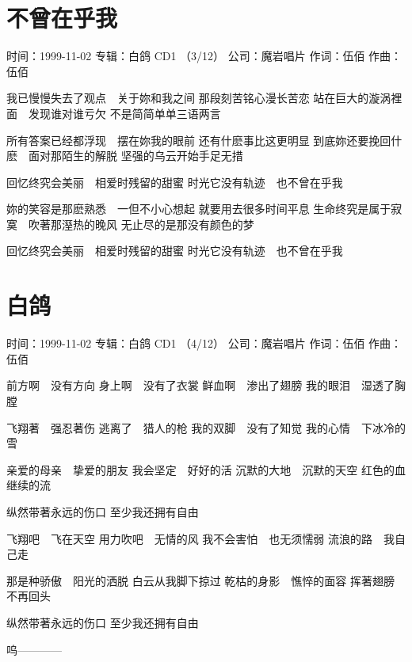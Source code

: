 \documentclass[UTF8,a4paper,oneside,twocolumn,12pt]{ctexbook}
\newcommand{\infopair}[2]{\textbullet #1：#2}
\newcommand{\zc}[1][伍佰]{\infopair{作词}{#1}}
\newcommand{\zq}[1][伍佰]{\infopair{作曲}{#1}}
\newcommand{\zj}[1]{\infopair{专辑}{#1}}
\newcommand{\sj}[1]{\infopair{时间}{#1}}
\newcommand{\gs}[1]{\infopair{公司}{#1}}
\newenvironment{info}{\begin{flushleft}\kaishu
	}
	{\end{flushleft}\normalsize\yahei\par}
\newenvironment{lyric}{
	}
{}
\begin{document}
\section{不曾在乎我}
\begin{info}
	\sj{1999-11-02}
	\zj{白鸽 CD1 （3/12）}
	\gs{魔岩唱片}
	\zc
	\zq
\end{info}
\begin{lyric}
	我已慢慢失去了观点　关于妳和我之间
	那段刻苦铭心漫长苦恋
	站在巨大的漩涡裡面　发现谁对谁亏欠
	不是简简单单三语两言

	所有答案已经都浮现　摆在妳我的眼前
	还有什麽事比这更明显
	到底妳还要挽回什麽　面对那陌生的解脱
	坚强的乌云开始手足无措

	回忆终究会美丽　相爱时残留的甜蜜
	时光它没有轨迹　也不曾在乎我

	妳的笑容是那麽熟悉　一但不小心想起
	就要用去很多时间平息
	生命终究是属于寂寞　吹著那溼热的晚风
	无止尽的是那没有颜色的梦

	回忆终究会美丽　相爱时残留的甜蜜
	时光它没有轨迹　也不曾在乎我
\end{lyric}

\section{白鸽}
\begin{info}
	\sj{1999-11-02}
	\zj{白鸽 CD1 （4/12）}
	\gs{魔岩唱片}
	\zc
	\zq
\end{info}
\begin{lyric}
	前方啊　没有方向
	身上啊　没有了衣裳
	鲜血啊　渗出了翅膀
	我的眼泪　湿透了胸膛

	飞翔著　强忍著伤
	逃离了　猎人的枪
	我的双脚　没有了知觉
	我的心情　下冰冷的雪

	亲爱的母亲　挚爱的朋友
	我会坚定　好好的活
	沉默的大地　沉默的天空
	红色的血　继续的流

	纵然带著永远的伤口
	至少我还拥有自由

	飞翔吧　飞在天空
	用力吹吧　无情的风
	我不会害怕　也无须懦弱
	流浪的路　我自己走

	那是种骄傲　阳光的洒脱
	白云从我脚下掠过
	乾枯的身影　憔悴的面容
	挥著翅膀　不再回头

	纵然带著永远的伤口
	至少我还拥有自由

	呜————
\end{lyric}
\end{document}
